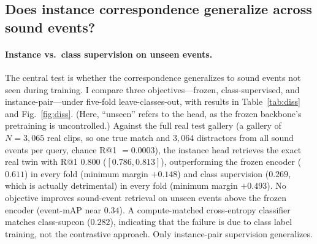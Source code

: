 \documentclass{article}
\begin{document}
\subsection{Does instance correspondence generalize across sound events?}
\label{sec:diss}
\paragraph{Instance vs.\ class supervision on unseen events.} The central test is whether the correspondence generalizes to sound events not seen during training. I compare three objectives---frozen, class-supervised, and instance-pair---under five-fold leave-classes-out, with results in Table~\ref{tab:diss} and Fig.~\ref{fig:diss}. (Here, ``unseen'' refers to the head, as the frozen backbone's pretraining is uncontrolled.) Against the full real test gallery (a gallery of $N\!=\!3{,}065$ real clips, so one true match and $3{,}064$ distractors from all sound events per query, chance R@1 $=0.0003$), the instance head retrieves the exact real twin with R@1 $0.800$ ($[0.786,0.813]$), outperforming the frozen encoder ($0.611$) in every fold (minimum margin $+0.148$) and class supervision ($0.269$, which is actually detrimental) in every fold (minimum margin $+0.493$). No objective improves sound-event retrieval on unseen events above the frozen encoder (event-mAP near $0.34$). A compute-matched cross-entropy classifier matches class-supcon ($0.282$), indicating that the failure is due to class label training, not the contrastive approach. Only instance-pair supervision generalizes.
\end{document}
